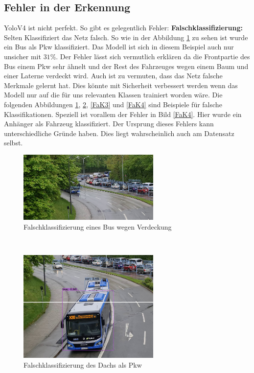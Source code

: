 \documentclass[conference]{IEEEtran}
\begin{document}
	\subsection{Fehler in der Erkennung}
	YoloV4 ist nicht perfekt. So gibt es gelegentlich Fehler:
	\textbf{Falschklassifizierung:}\\
	Selten Klassifiziert das Netz falsch. So wie in der Abbildung \ref{FaK} zu sehen ist wurde ein Bus als Pkw klassifiziert. Das Modell ist sich in diesem Beispiel auch nur unsicher mit $31\%$. Der Fehler lässt sich vermutlich erklären da die Frontpartie des Bus einem Pkw sehr ähnelt und der Rest des Fahrzeuges wegen einem Baum und einer Laterne verdeckt wird. Auch ist zu vermuten, dass das Netz falsche Merkmale gelernt hat. Dies könnte mit Sicherheit verbessert werden wenn das Modell nur auf die für uns relevanten Klassen trainiert worden wäre. Die folgenden Abbildungen \ref{FaK}, \ref{FaK2}, \ref{FaK3} und \ref{FaK4} sind Beispiele für falsche Klassifikationen. Speziell ist vorallem der Fehler in Bild \ref{FaK4}. Hier wurde ein Anhänger als Fahrzeug klassifiziert. Der Ursprung dieses Fehlers kann unterschiedliche Gründe haben. Dies liegt wahrscheinlich auch am Datensatz selbst.
	\begin{figure}[!h]
		\begin{center}
			\includegraphics[width=7cm]{Media/Output_480 - Kopie.jpg}
			\caption{Falschklassifizierung eines Bus wegen Verdeckung}
			\label{FaK}
		\end{center}
	\end{figure}\\
	\begin{figure}[!h]
		\begin{center}
			\includegraphics[width=7cm]{Media/Output_847 - Kopie.jpg}
			\caption{Falschklassifizierung des Dachs als Pkw}
			\label{FaK2}
		\end{center}
	\end{figure}\\
\end{document}

